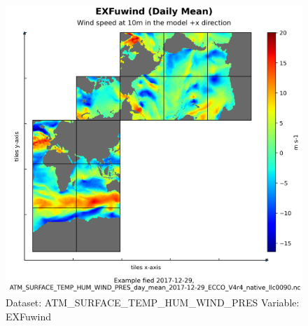 \begin{figure}[H]
\centering
\includegraphics[width=\textwidth]{../images/plots/native_plots/Atmosphere_Surface_Temperature_Humidity_Wind_and_Pressure/EXFuwind.png}
\caption{Dataset: ATM\_SURFACE\_TEMP\_HUM\_WIND\_PRES Variable: EXFuwind}
\label{tab:table-ATM_SURFACE_TEMP_HUM_WIND_PRES_EXFuwind-Plot}
\end{figure}
\pagebreak
